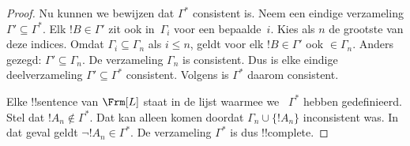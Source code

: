 \documentclass[../../../include/open-logic-section]{subfiles}
\begin{document}
\begin{proof}
Nu kunnen we bewijzen dat $\Gamma^*$ consistent is. Neem een eindige
verzameling $\Gamma' \subseteq \Gamma^*$. Elk $!B \in \Gamma'$ zit ook
in~$\Gamma_i$ voor een bepaalde~$i$. Kies als $n$ de grootste van deze
indices. Omdat $\Gamma_i \subseteq \Gamma_n$ als $i \le n$, geldt
voor elk $!B \in \Gamma'$ ook $\in \Gamma_n$. Anders gezegd:
$\Gamma' \subseteq \Gamma_n$. De verzameling $\Gamma_n$ is consistent.
Dus is elke eindige deelverzameling $\Gamma' \subseteq \Gamma^*$
consistent. Volgens  is $\Gamma^*$ daarom
consistent.

Elke !!{sentence} van $\Frm[L]$ staat in de lijst waarmee we
~$\Gamma^*$ hebben gedefinieerd. Stel dat $!A_n \notin \Gamma^*$. Dat
kan alleen komen doordat $\Gamma_n \cup \{!A_n\}$ inconsistent was. In
dat geval geldt $\lnot !A_n \in \Gamma^*$. De verzameling $\Gamma^*$ is
dus !!{complete}.
\end{proof}
\end{document}
